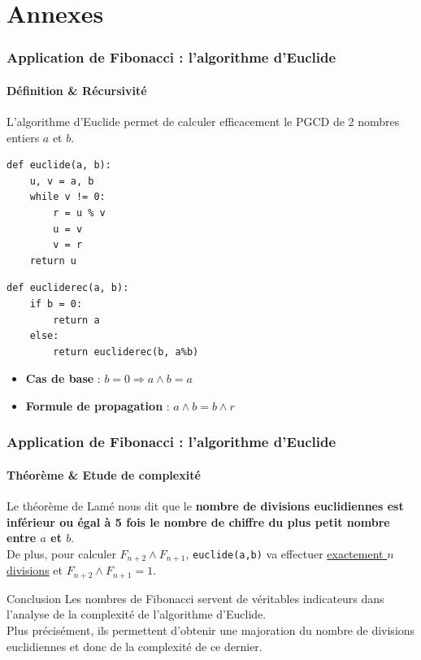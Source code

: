 \documentclass[10pt]{beamer}
\begin{document}
\section*{Annexes}
\begin{frame}[fragile]
\frametitle{Application de Fibonacci : l'algorithme d'Euclide}
\framesubtitle{Définition \& Récursivité}
L'algorithme d'Euclide permet de calculer efficacement le PGCD de 2 nombres entiers $a$ et $b$.
\begin{multicols}{2}
\begin{verbatim}
def euclide(a, b):
    u, v = a, b
    while v != 0:
        r = u % v
        u = v
        v = r
    return u
\end{verbatim}
\columnbreak
\begin{verbatim}
def eucliderec(a, b):
    if b = 0:
        return a
    else:
        return eucliderec(b, a%b)
\end{verbatim}
\end{multicols}
\begin{itemize}
\item \textbf{Cas de base} : $b = 0 \Rightarrow a \wedge b = a$
\item \textbf{Formule de propagation} : $a \wedge b = b \wedge r$
\end{itemize}
\end{frame}

\begin{frame}[fragile]
\frametitle{Application de Fibonacci : l'algorithme d'Euclide}
\framesubtitle{Théorème \& Etude de complexité}
Le théorème de Lamé nous dit que le \textbf{nombre de divisions euclidiennes est inférieur ou égal à 5 fois le nombre de chiffre du plus petit nombre entre $a$ et $b$}.
\pause
\\
De plus, pour calculer $F_{n+2} \wedge F_{n+1}$, \verb+euclide(a,b)+ va effectuer \underline{exactement $n$ divisions} et $F_{n+2} \wedge F_{n+1} = 1$.
\vspace{3mm}
\pause
\begin{alertblock}{Conclusion}
Les nombres de Fibonacci servent de véritables indicateurs dans l'analyse de la complexité de l'algorithme d'Euclide.
\\
Plus précisément, ils permettent d'obtenir une majoration du nombre de divisions euclidiennes et donc de la complexité de ce dernier.
\end{alertblock}
\end{frame}
\end{document}
